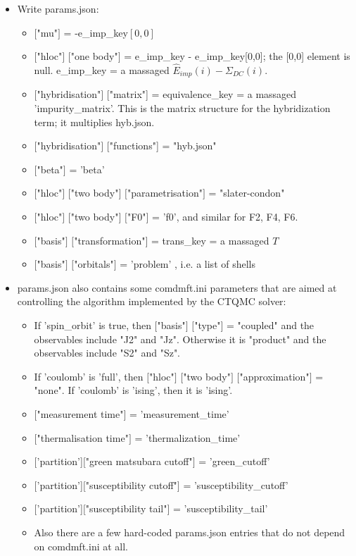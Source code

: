 \documentclass[aps,prb,singlecolumn,preprintnumbers,amsmath,amssymb]{revtex4}
\begin{document}
\begin{itemize}
\item Write params.json:
\begin{itemize}
\item $[$"mu"$]$ = -e\_imp\_key$[0,0]$
\item $[$"hloc"$]$ $[$"one body"$]$ = e\_imp\_key - e\_imp\_key[0,0]; the [0,0] element is null. e\_imp\_key  = a massaged $\hat{E}_{imp}(i)-\Sigma_{DC}(i)$.
\item $[$"hybridisation"$]$ $[$"matrix"] = equivalence\_key = a massaged 'impurity\_matrix'. This is the matrix structure for the hybridization term; it multiplies hyb.json.
\item $[$"hybridisation"$]$ $[$"functions"] = "hyb.json"
\item $[$"beta"$]$ = 'beta'
\item $[$"hloc"$]$ $[$"two body"$]$ $[$"parametrisation"$]$ = "slater-condon"
\item $[$"hloc"$]$ $[$"two body"$]$ $[$"F0"$]$ = 'f0', and similar for F2, F4, F6. 
\item $[$"basis"$]$ $[$"transformation"$]$ = trans\_key = a massaged $T$
\item $[$"basis"$]$ $[$"orbitals"$]$ = 'problem' , i.e. a list of shells
\end{itemize}
\item params.json also contains some comdmft.ini parameters that are aimed at controlling the algorithm implemented by the CTQMC solver:
\begin{itemize}
\item If 'spin\_orbit' is true, then $[$"basis"$]$ $[$"type"$]$ = "coupled" and the observables include "J2" and "Jz".  Otherwise it is "product" and the observables include "S2" and "Sz". 
\item If 'coulomb' is 'full', then $[$"hloc"$]$ $[$"two body"$]$ $[$"approximation"$]$ = "none".  If 'coulomb' is 'ising', then it is 'ising'.
\item $[$"measurement time"$]$ = 'measurement\_time'
 \item $[$"thermalisation time"$]$ = 'thermalization\_time'
 \item $[$'partition']$[$"green matsubara cutoff"$]$ = 'green\_cutoff'
 \item $[$'partition']$[$"susceptibility cutoff"$]$ = 'susceptibility\_cutoff'
 \item $[$'partition']$[$"susceptibility tail"$]$ = 'susceptibility\_tail'
 \item Also there are a few hard-coded params.json entries that do not depend on comdmft.ini at all.
\end{itemize} 



\end{itemize}
\end{document}
